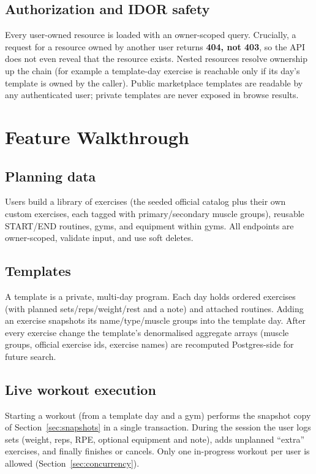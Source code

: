 \documentclass[11pt,a4paper]{article}
\begin{document}
\subsection{Authorization and IDOR safety}
Every user-owned resource is loaded with an owner-scoped query. Crucially, a request for a resource
owned by another user returns \textbf{404, not 403}, so the API does not even reveal that the
resource exists. Nested resources resolve ownership up the chain (for example a template-day
exercise is reachable only if its day's template is owned by the caller). Public marketplace
templates are readable by any authenticated user; private templates are never exposed in browse
results.

\section{Feature Walkthrough}

\subsection{Planning data}
Users build a library of exercises (the seeded official catalog plus their own custom exercises,
each tagged with primary/secondary muscle groups), reusable START/END routines, gyms, and
equipment within gyms. All endpoints are owner-scoped, validate input, and use soft deletes.

\subsection{Templates}
A template is a private, multi-day program. Each day holds ordered exercises (with planned
sets/reps/weight/rest and a note) and attached routines. Adding an exercise snapshots its
name/type/muscle groups into the template day. After every exercise change the template's
denormalised aggregate arrays (muscle groups, official exercise ids, exercise names) are recomputed
Postgres-side for future search.

\subsection{Live workout execution}
Starting a workout (from a template day and a gym) performs the snapshot copy of
Section~\ref{sec:snapshots} in a single transaction. During the session the user logs sets
(weight, reps, RPE, optional equipment and note), adds unplanned ``extra'' exercises, and finally
finishes or cancels. Only one in-progress workout per user is allowed (Section~\ref{sec:concurrency}).
\end{document}
